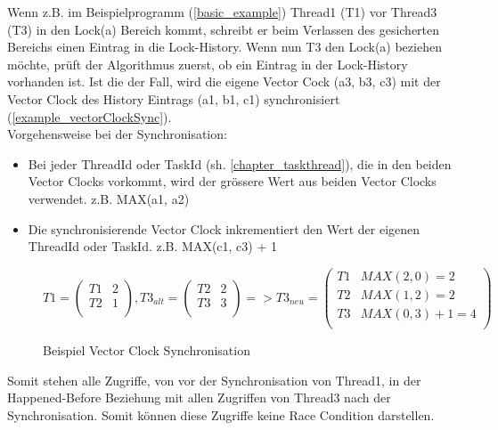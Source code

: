 \documentclass[10pt,a4paper]{article}
\begin{document}
\begin{flushleft}
Wenn z.B. im Beispielprogramm (\autoref{basic_example}) Thread1 (T1) vor Thread3 (T3) in den Lock(a) Bereich kommt, schreibt er beim Verlassen des gesicherten Bereichs einen Eintrag in die Lock-History. Wenn nun T3 den Lock(a) beziehen möchte, prüft der Algorithmus zuerst, ob ein Eintrag in der Lock-History vorhanden ist. Ist die der Fall, wird die eigene Vector Cock (a3, b3, c3) mit der Vector Clock des History Eintrags (a1, b1, c1) synchronisiert (\autoref{example_vectorClockSync}).\\
\newpage
Vorgehensweise bei der Synchronisation:
\begin{itemize}
\item Bei jeder ThreadId oder TaskId (sh. \ref{chapter_taskthread}), die in den beiden Vector Clocks vorkommt, wird der grössere Wert aus beiden Vector Clocks verwendet. z.B. MAX(a1, a2)
\item Die synchronisierende Vector Clock inkrementiert den Wert der eigenen ThreadId oder TaskId. z.B. MAX(c1, c3) + 1
\end{itemize}
\begin{figure}[H]
\[
	T1 = \begin{pmatrix}
		T1 & 2\\
		T2 & 1\\
	\end{pmatrix},
	T3_{alt} = \begin{pmatrix}
		T2 & 2\\
		T3 & 3\\
	\end{pmatrix} =>
	T3_{neu} = \begin{pmatrix}
		T1 & MAX(2, 0) = 2\\
		T2 & MAX(1, 2) = 2\\
		T3 & MAX(0, 3) + 1 = 4\\
	\end{pmatrix}
\]
\caption{Beispiel Vector Clock Synchronisation}\label{example_vectorClockSync}
\end{figure}
Somit stehen alle Zugriffe, von vor der Synchronisation von Thread1, in der Happened-Before Beziehung mit allen Zugriffen von Thread3 nach der Synchronisation. Somit können diese Zugriffe keine Race Condition darstellen.
\end{flushleft}
\end{document}
